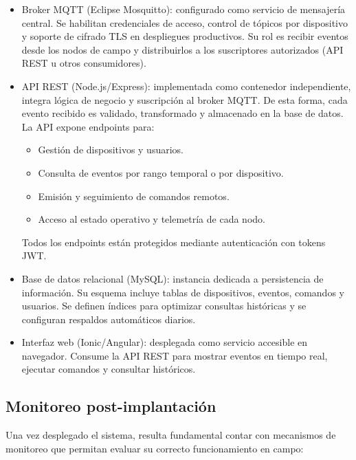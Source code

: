 \begin{itemize}
    \item Broker MQTT (Eclipse Mosquitto): configurado como servicio de mensajería central. Se habilitan credenciales de acceso, control de tópicos por dispositivo y soporte de cifrado TLS en despliegues productivos. Su rol es recibir eventos desde los nodos de campo y distribuirlos a los suscriptores autorizados (API REST u otros consumidores).
    
    \item API REST (Node.js/Express): implementada como contenedor independiente, integra lógica de negocio y suscripción al broker MQTT. De esta forma, cada evento recibido es validado, transformado y almacenado en la base de datos. La API expone endpoints para:
    \begin{itemize}
        \item Gestión de dispositivos y usuarios.
        \item Consulta de eventos por rango temporal o por dispositivo.
        \item Emisión y seguimiento de comandos remotos.
        \item Acceso al estado operativo y telemetría de cada nodo.
    \end{itemize}
    Todos los endpoints están protegidos mediante autenticación con tokens JWT.
    
    \item Base de datos relacional (MySQL): instancia dedicada a persistencia de información. Su esquema incluye tablas de dispositivos, eventos, comandos y usuarios. Se definen índices para optimizar consultas históricas y se configuran respaldos automáticos diarios.
    
    \item Interfaz web (Ionic/Angular): desplegada como servicio accesible en navegador. Consume la API REST para mostrar eventos en tiempo real, ejecutar comandos y consultar históricos.
\end{itemize}

\subsection{Monitoreo post-implantación}

Una vez desplegado el sistema, resulta fundamental contar con mecanismos de monitoreo que permitan evaluar su correcto funcionamiento en campo:  

